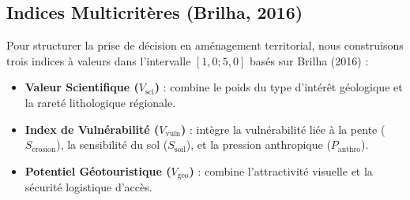 \documentclass[11pt,twocolumn,a4paper]{article}
\begin{document}
\begin{table}[t]
    \centering
    \caption{Extrait du jeu de données des géosites régionaux étiquetés par le moteur Fuzzy MCDSS (5 enregistrements d'échantillon)}
    \label{tab:sample_reg}
\end{table}

\subsection{Indices Multicritères (Brilha, 2016)}
Pour structurer la prise de décision en aménagement territorial, nous construisons trois indices à valeurs dans l'intervalle $[1,0; 5,0]$ basés sur Brilha (2016) :
\begin{itemize}
    \item \textbf{Valeur Scientifique ($V_{\text{sci}}$)} : combine le poids du type d'intérêt géologique et la rareté lithologique régionale.
    \item \textbf{Index de Vulnérabilité ($V_{\text{vuln}}$)} : intègre la vulnérabilité liée à la pente ($S_{\text{erosion}}$), la sensibilité du sol ($S_{\text{soil}}$), et la pression anthropique ($P_{\text{anthro}}$).
    \item \textbf{Potentiel Géotouristique ($V_{\text{geo}}$)} : combine l'attractivité visuelle et la sécurité logistique d'accès.
\end{itemize}
\end{document}
